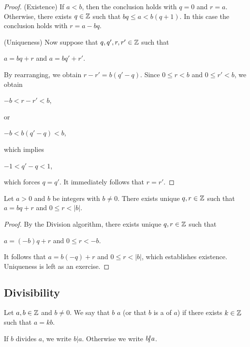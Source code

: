 \documentclass[11pt,fleqn,dvipsnames,usenames]{article}
\newcommand{\p}{\noindent}
\begin{document}
\begin{proof}

(Existence) If $a < b$, then the conclusion holds with $q = 0$ and $r = a$.  Otherwise, there exists $q\in\mathbb{Z}$ such that $bq \leq a < b(q + 1)$.  In this case the conclusion holds with $r = a - bq$.
\vsp

\p (Uniqueness) Now suppose that $q, q', r, r'\in \mathbb{Z}$ such that
\begin{center}
$a = bq + r$ and $a = bq' + r'$.
\end{center}
By rearranging, we obtain $r - r' = b(q' - q)$.  Since $0 \leq r < b$ and $0 \leq r' < b$, we obtain
\begin{center}
$-b < r - r' < b$,
\end{center}
or
\begin{center}
$-b < b(q' - q) < b$,
\end{center}
which implies
\begin{center}
$-1 < q' - q < 1$,
\end{center}
which forces $q = q'$.  It immediately follows that $r = r'$.
\end{proof}
\newpage

\begin{corollary} Let $a > 0$ and $b$ be integers with $b\neq 0$.  There exists unique $q,r\in\mathbb{Z}$ such that $a = bq + r$ and $0\leq r < |b|$.
\end{corollary}

\begin{proof} By the Division algorithm, there exists unique $q,r\in \mathbb{Z}$ such that
\begin{center}
$a = (-b)q + r$ and $0 \leq r < -b$.  
\end{center}
It follows that $a = b(-q) + r$ and $0\leq r < |b|$, which establishes existence.  Uniqueness is left as an exercise.
\end{proof}

\subsection{Divisibility}

\begin{definition} Let $a,b\in\mathbb{Z}$ and $b\neq 0$.  We say that $b$  $a$ (or that $b$ is a  of $a$) if there exists $k\in\mathbb{Z}$ such that $a = kb$.
\end{definition}

\notation If $b$ divides $a$, we write $b | a$.  Otherwise we write $b|\kern-0.9ex{/} a$.
\vsp
\end{document}

